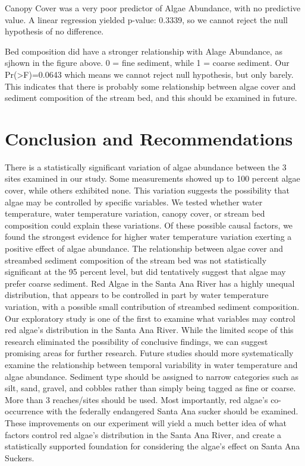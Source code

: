 \documentclass{article}
\begin{document}
Canopy Cover was a very poor predictor of Algae Abundance, with no predictive value. A linear regression yielded p-value: 0.3339, so we cannot reject the null hypothesis of no difference.


Bed composition did have a stronger relationship with Alage Abundance, as sjhown in the figure above. 0 = fine sediment, while 1 = coarse sediment. Our Pr(>F)=0.0643 which means we cannot reject null hypothesis, but only barely. This indicates that there is probably some relationship between algae cover and sediment composition of the stream bed, and this should be examined in future.

\section{Conclusion and Recommendations}
There is a statistically significant variation of algae abundance between the 3 sites examined in our study. Some measurements showed up to 100 percent algae cover, while others exhibited none. This variation suggests the possibility that algae may be controlled by specific variables. We tested whether water temperature, water temperature variation, canopy cover, or stream bed composition could explain these variations. Of these possible causal factors, we found the strongest evidence for higher water temperature variation exerting a positive effect of algae abundance. The relationship between algae cover and streambed sediment composition of the stream bed was not statistically significant at the 95 percent level, but did tentatively suggest that algae may prefer coarse sediment. Red Algae in the Santa Ana River has a highly unequal distribution, that appears to be controlled in part by water temperature variation, with a possible small contribution of streambed sediment composition. 
Our exploratory study is one of the first to examine what variables may control red algae's distribution in the Santa Ana River. While the limited scope of this research eliminated the possibility of conclusive findings, we can suggest promising areas for further research. Future studies should more systematically examine the relationship between temporal variability in water temperature and algae abundance. Sediment type should be assigned to narrow categories such as silt, sand, gravel, and cobbles rather than simply being tagged as fine or coarse. More than 3 reaches/sites should be used. Most importantly, red algae’s co-occurrence with the federally endangered Santa Ana sucker should be examined. These improvements on our experiment will yield a much better idea of what factors control red algae’s distribution in the Santa Ana River, and create a statistically supported foundation for considering the algae’s effect on Santa Ana Suckers. 
\end{document}
